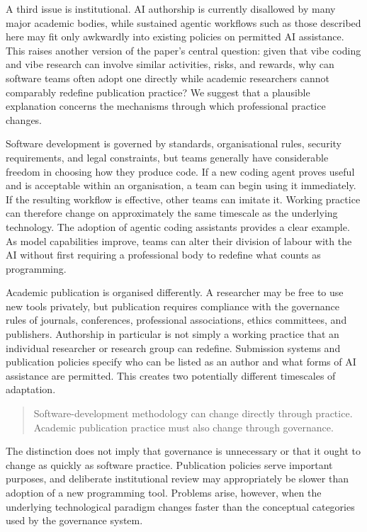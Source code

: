 \documentclass[12pt]{article}
\begin{document}
A third issue is institutional. AI authorship is currently disallowed by many major academic bodies, while sustained agentic workflows such as those described here may fit only awkwardly into existing policies on permitted AI assistance. This raises another version of the paper's central question: given that vibe coding and vibe research can involve similar activities, risks, and rewards, why can software teams often adopt one directly while academic researchers cannot comparably redefine publication practice? We suggest that a plausible explanation concerns the mechanisms through which professional practice changes.

Software development is governed by standards, organisational rules, security requirements, and legal constraints, but teams generally have considerable freedom in choosing how they produce code. If a new coding agent proves useful and is acceptable within an organisation, a team can begin using it immediately. If the resulting workflow is effective, other teams can imitate it. Working practice can therefore change on approximately the same timescale as the underlying technology.
The adoption of agentic coding assistants provides a clear example. As model capabilities improve, teams can alter their division of labour with the AI without first requiring a professional body to redefine what counts as programming.

Academic publication is organised differently.
A researcher may be free to use new tools privately, but publication requires compliance with the governance rules of journals, conferences, professional associations, ethics committees, and publishers. Authorship in particular is not simply a working practice that an individual researcher or research group can redefine. Submission systems and publication policies specify who can be listed as an author and what forms of AI assistance are permitted.
This creates two potentially different timescales of adaptation.
\begin{quote}
Software-development methodology can change directly through practice. Academic publication practice must also change through governance.
\end{quote}
The distinction does not imply that governance is unnecessary or that it ought to change as quickly as software practice. Publication policies serve important purposes, and deliberate institutional review may appropriately be slower than adoption of a new programming tool.
Problems arise, however, when the underlying technological paradigm changes faster than the conceptual categories used by the governance system.
\end{document}
